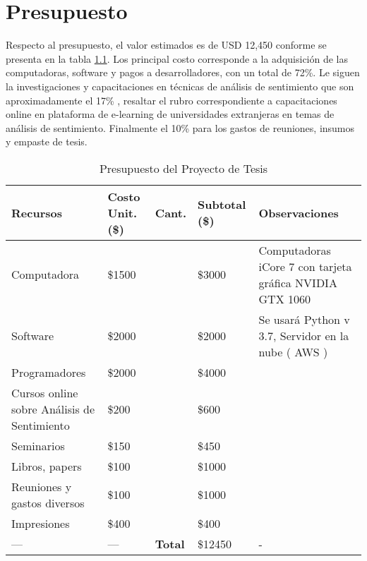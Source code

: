%
\chapter{Presupuesto}

Respecto al presupuesto, el valor estimados es de USD 12,450 conforme se presenta en la tabla \ref{budget_tbl}. Los principal costo corresponde a la adquisici\'on de las computadoras, software y pagos a desarrolladores, con un total de 72\%. Le siguen la investigaciones y capacitaciones en t\'ecnicas de an\'alisis de sentimiento que son aproximadamente el 17\% , resaltar el rubro correspondiente a capacitaciones online en plataforma de e-learning de universidades extranjeras en temas de an\'alisis de sentimiento.  Finalmente el 10\% para los gastos de reuniones, insumos y empaste de tesis.


\begin{table}[h!]

\begin{tabular}{ |p{4.25cm}|p{1.5cm}|p{1cm}|p{1.5cm}|p{5cm}| }
\hline
\rowcolor{gray!40}  \textbf{Recursos}         & \textbf{Costo Unit.(\$)}      & \textbf{Cant.} & \textbf{Subtotal (\$)} & \textbf{Observaciones}   \\  \hline
 Computadora                        & \raggedleft \$1500  &\centering 2  &\raggedleft \$3000  &  Computadoras iCore 7 con tarjeta gr\'afica NVIDIA GTX 1060    \\   \hline
 Software                        & \raggedleft \$2000  &\centering 1  &\raggedleft \$2000  &  Se usar\'a Python v 3.7, Servidor en la nube ( AWS )    \\   \hline
 Programadores              & \raggedleft \$2000    & \centering 2  &\raggedleft \$4000   & \\   \hline
 Cursos online sobre An\'alisis de Sentimiento              &\raggedleft  \$200    &\centering 3  &\raggedleft  \$600   & \\   \hline
 Seminarios              & \raggedleft \$150    & \centering 3  &\raggedleft \$450   & \\   \hline
 Libros, papers              & \raggedleft \$100    & \centering 10  &\raggedleft \$1000   & \\   \hline
Reuniones y gastos diversos              & \raggedleft \$100    & \centering 10  &\raggedleft \$1000   & \\   \hline
Impresiones              & \raggedleft \$400    & \centering 1  &\raggedleft \$400   & \\   \hline
 \centering          ---           &   \centering   --- & \cellcolor{gray!40} \textbf{Total}   &\raggedleft \$12450   &  -  \\   \hline
\end{tabular}
\caption{Presupuesto del Proyecto de Tesis}
\label{budget_tbl}
\end{table}



\cleardoublepage
